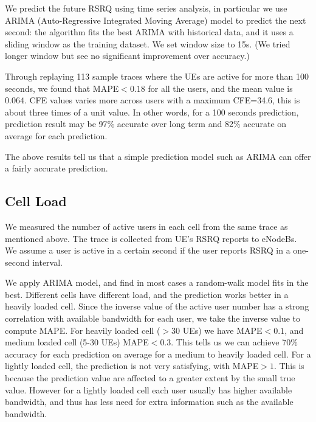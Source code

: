 We predict the future RSRQ using time series analysis, in particular we use ARIMA (Auto-Regressive Integrated Moving Average) model to predict the next second: the algorithm fits the best ARIMA with historical data, and it uses a sliding window as the training dataset. We set window size to 15s. (We tried longer window but see no significant improvement over accuracy.) 

Through replaying 113 sample traces where the UEs are active for more than 100 seconds, we found that MAPE$<0.18$ for all the users, and the mean value is $0.064$. CFE values varies more across users with a maximum CFE=34.6, this is about three times of a unit value. In other words, for a 100 seconds prediction, prediction result may be 97\% accurate over long term and 82\% accurate on average for each prediction. 

The above results tell us that a simple prediction model such as ARIMA can offer a fairly accurate prediction. 

\subsection{Cell Load}\label{subsec:NUser}
We measured the number of active users in each cell from the same trace as mentioned above. The trace is collected from UE's RSRQ reports to eNodeBs. We assume a user is active in a certain second if the user reports RSRQ in a one-second interval. 

We apply ARIMA model, and find in most cases a random-walk model fits in the best. Different cells have different load, and the prediction works better in a heavily loaded cell. Since the inverse value of the active user number has a strong correlation with available bandwidth for each user, we take the inverse value to compute MAPE. For heavily loaded cell ($>30$ UEs) we have MAPE$<0.1$, and medium loaded cell (5-30 UEs) MAPE$<0.3$. This tells us we can achieve 70\% accuracy for each prediction on average for a medium to heavily loaded cell. For a lightly loaded cell, the prediction is not very satisfying, with MAPE$>1$. This is because the prediction value are affected to a greater extent by the small true value. However for a lightly loaded cell each user usually has higher available bandwidth, and thus has less need for extra information such as the available bandwidth.  

